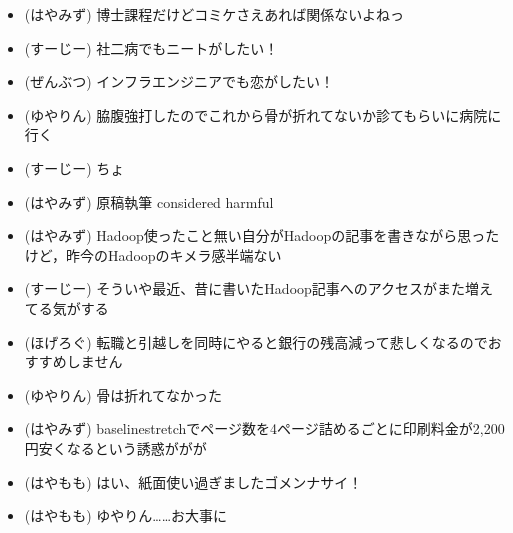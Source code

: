 
%
%

\begin{itemize}
 \item (はやみず) 博士課程だけどコミケさえあれば関係ないよねっ
 \item (すーじー) 社二病でもニートがしたい！
 \item (ぜんぶつ) インフラエンジニアでも恋がしたい！
 \item (ゆやりん) 脇腹強打したのでこれから骨が折れてないか診てもらいに病院に行く
 \item (すーじー) ちょ
 \item (はやみず) 原稿執筆 considered harmful
 \item (はやみず) Hadoop使ったこと無い自分がHadoopの記事を書きながら思ったけど，昨今のHadoopのキメラ感半端ない
 \item (すーじー) そういや最近、昔に書いたHadoop記事へのアクセスがまた増えてる気がする
 \item (ほげろぐ) 転職と引越しを同時にやると銀行の残高減って悲しくなるのでおすすめしません
 \item (ゆやりん) 骨は折れてなかった
 \item (はやみず) baselinestretchでページ数を4ページ詰めるごとに印刷料金が2,200円安くなるという誘惑ががが
 \item (はやもも) はい、紙面使い過ぎましたゴメンナサイ！
 \item (はやもも) ゆやりん……お大事に
\end{itemize}
